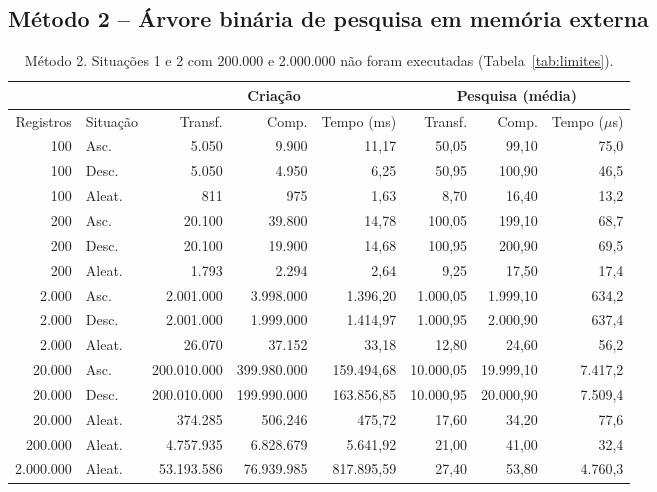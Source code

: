 \documentclass{article}
\begin{document}
\subsection{Método 2 -- Árvore binária de pesquisa em memória externa}

\begin{table}[!htb]
    \centering
    \footnotesize
    \begin{tabular}{|r|l|r|r|r|r|r|r|}
        \hline\hline
        & & \multicolumn{3}{c|}{Criação} & \multicolumn{3}{c|}{Pesquisa (média)} \\\hline
        Registros & Situação & Transf. & Comp. & Tempo (ms) & Transf. & Comp. & Tempo ($\mu$s) \\\hline
        100       & Asc.  & 5.050       & 9.900       & 11,17      & 50,05     & 99,10     & 75,0 \\
        100       & Desc. & 5.050       & 4.950       & 6,25       & 50,95     & 100,90    & 46,5 \\
        100       & Aleat.& 811         & 975         & 1,63       & 8,70      & 16,40     & 13,2 \\\hline
        200       & Asc.  & 20.100      & 39.800      & 14,78      & 100,05    & 199,10    & 68,7 \\
        200       & Desc. & 20.100      & 19.900      & 14,68      & 100,95    & 200,90    & 69,5 \\
        200       & Aleat.& 1.793       & 2.294       & 2,64       & 9,25      & 17,50     & 17,4 \\\hline
        2.000     & Asc.  & 2.001.000   & 3.998.000   & 1.396,20   & 1.000,05  & 1.999,10  & 634,2 \\
        2.000     & Desc. & 2.001.000   & 1.999.000   & 1.414,97   & 1.000,95  & 2.000,90  & 637,4 \\
        2.000     & Aleat.& 26.070      & 37.152      & 33,18      & 12,80     & 24,60     & 56,2 \\\hline
        20.000    & Asc.  & 200.010.000 & 399.980.000 & 159.494,68 & 10.000,05 & 19.999,10 & 7.417,2 \\
        20.000    & Desc. & 200.010.000 & 199.990.000 & 163.856,85 & 10.000,95 & 20.000,90 & 7.509,4 \\
        20.000    & Aleat.& 374.285     & 506.246     & 475,72     & 17,60     & 34,20     & 77,6 \\\hline
        200.000   & Aleat.& 4.757.935   & 6.828.679   & 5.641,92   & 21,00     & 41,00     & 32,4 \\\hline
        2.000.000 & Aleat.& 53.193.586  & 76.939.985  & 817.895,59 & 27,40     & 53,80     & 4.760,3 \\\hline\hline
    \end{tabular}
    \caption{\label{tab:m2}Método 2. Situações 1 e 2 com 200.000 e 2.000.000 não foram executadas (Tabela~\ref{tab:limites}).}
\end{table}
\end{document}
